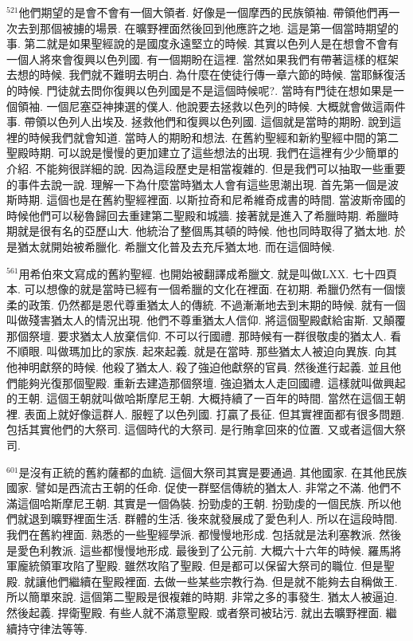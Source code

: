 \documentclass{book}
\begin{document}
$^{521}$他們期望的是會不會有一個大領者.
好像是一個摩西的民族領袖.
帶領他們再一次去到那個被擄的場景.
在曠野裡面然後回到他應許之地.
這是第一個當時期望的事.
第二就是如果聖經說的是國度永遠堅立的時候.
其實以色列人是在想會不會有一個人將來會復興以色列國.
有一個期盼在這裡.
當然如果我們有帶著這樣的框架去想的時候.
我們就不難明去明白.
為什麼在使徒行傳一章六節的時候.
當耶穌復活的時候.
門徒就去問你復興以色列國是不是這個時候呢?.
當時有門徒在想如果是一個領袖.
一個尼塞亞神揀選的僕人.
他說要去拯救以色列的時候.
大概就會做這兩件事.
帶領以色列人出埃及.
拯救他們和復興以色列國.
這個就是當時的期盼.
說到這裡的時候我們就會知道.
當時人的期盼和想法.
在舊約聖經和新約聖經中間的第二聖殿時期.
可以說是慢慢的更加建立了這些想法的出現.
我們在這裡有少少簡單的介紹.
不能夠很詳細的說.
因為這段歷史是相當複雜的.
但是我們可以抽取一些重要的事件去說一說.
理解一下為什麼當時猶太人會有這些思潮出現.
首先第一個是波斯時期.
這個也是在舊約聖經裡面.
以斯拉奇和尼希維奇成書的時間.
當波斯帝國的時候他們可以秘魯歸回去重建第二聖殿和城牆.
接著就是進入了希臘時期.
希臘時期就是很有名的亞歷山大.
他統治了整個馬其頓的時候.
他也同時取得了猶太地.
於是猶太就開始被希臘化.
希臘文化普及去充斥猶太地.
而在這個時候.

$^{561}$用希伯來文寫成的舊約聖經.
也開始被翻譯成希臘文.
就是叫做LXX.
七十四頁本.
可以想像的就是當時已經有一個希臘的文化在裡面.
在初期.
希臘仍然有一個懷柔的政策.
仍然都是恩代尊重猶太人的傳統.
不過漸漸地去到末期的時候.
就有一個叫做殘害猶太人的情況出現.
他們不尊重猶太人信仰.
將這個聖殿獻給宙斯.
又顛覆那個祭壇.
要求猶太人放棄信仰.
不可以行國禮.
那時候有一群很敬虔的猶太人.
看不順眼.
叫做瑪加比的家族.
起來起義.
就是在當時.
那些猶太人被迫向異族.
向其他神明獻祭的時候.
他殺了猶太人.
殺了強迫他獻祭的官員.
然後進行起義.
並且他們能夠光復那個聖殿.
重新去建造那個祭壇.
強迫猶太人走回國禮.
這樣就叫做興起的王朝.
這個王朝就叫做哈斯摩尼王朝.
大概持續了一百年的時間.
當然在這個王朝裡.
表面上就好像這群人.
服輕了以色列國.
打贏了長征.
但其實裡面都有很多問題.
包括其實他們的大祭司.
這個時代的大祭司.
是行賄拿回來的位置.
又或者這個大祭司.

$^{601}$是沒有正統的舊約薩都的血統.
這個大祭司其實是要通過.
其他國家.
在其他民族國家.
譬如是西流古王朝的任命.
促使一群堅信傳統的猶太人.
非常之不滿.
他們不滿這個哈斯摩尼王朝.
其實是一個偽裝.
扮勁虔的王朝.
扮勁虔的一個民族.
所以他們就退到曠野裡面生活.
群體的生活.
後來就發展成了愛色利人.
所以在這段時間.
我們在舊約裡面.
熟悉的一些聖經學派.
都慢慢地形成.
包括就是法利塞教派.
然後是愛色利教派.
這些都慢慢地形成.
最後到了公元前.
大概六十六年的時候.
羅馬將軍龐統領軍攻陷了聖殿.
雖然攻陷了聖殿.
但是都可以保留大祭司的職位.
但是聖殿.
就讓他們繼續在聖殿裡面.
去做一些某些宗教行為.
但是就不能夠去自稱做王.
所以簡單來說.
這個第二聖殿是很複雜的時期.
非常之多的事發生.
猶太人被逼迫.
然後起義.
捍衛聖殿.
有些人就不滿意聖殿.
或者祭司被玷污.
就出去曠野裡面.
繼續持守律法等等.
\end{document}
